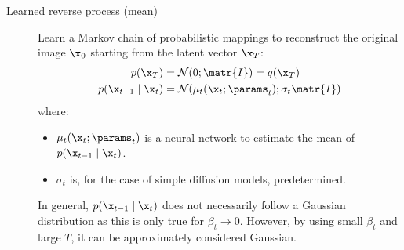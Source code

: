\begin{description}
    \item[Learned reverse process (mean)] 
        Learn a Markov chain of probabilistic mappings to reconstruct the original image $\x_0$ starting from the latent vector $\x_T$:
        \[
            \begin{split}
                p(\x_T) &= \mathcal{N}(0; \matr{I}) = q(\x_T) \\
                p(\x_{t-1} \mid \x_t) &= \mathcal{N}(\mu_t(\x_t; \params_t); \sigma_t\matr{I})
            \end{split}
        \]
        where:
        \begin{itemize}
            \item $\mu_t(\x_t; \params_t)$ is a neural network to estimate the mean of $p(\x_{t-1} \mid \x_t)$.
            \item $\sigma_t$ is, for the case of simple diffusion models, predetermined.
        \end{itemize}

        \begin{remark}
            In general, $p(\x_{t-1} \mid \x_t)$ does not necessarily follow a Gaussian distribution as this is only true for $\beta_t \rightarrow 0$. However, by using small $\beta_t$ and large $T$, it can be approximately considered Gaussian.
        \end{remark}


\end{description}
